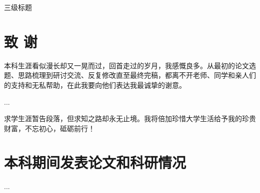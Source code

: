 \documentclass[openany,oneside]{book}
\begin{document}
三级标题


\clearpage
{}
{}

\chapter*{致 \qquad 谢}
\thispagestyle{empty}
本科生涯看似漫长却又一晃而过，回首走过的岁月，我感慨良多。从最初的论文选题、思路梳理到研讨交流、反复修改直至最终完稿，都离不开老师、同学和亲人们的支持和无私帮助，在此我要向他们表达我最诚挚的谢意。

...

求学生涯暂告段落，但求知之路却永无止境。我将倍加珍惜大学生活给予我的珍贵财富，不忘初心，砥砺前行！
\chapter*{本科期间发表论文和科研情况}
\thispagestyle{empty}

...
\end{document}
